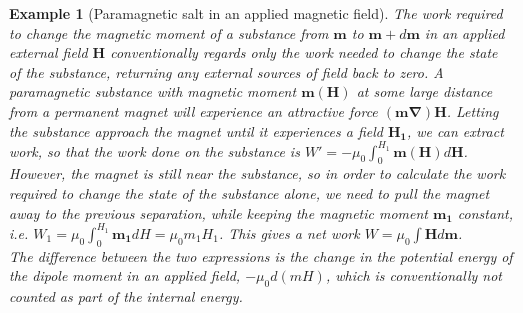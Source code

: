 \documentclass[a4paper]{article}
\newtheorem{eg}{Example}[section]
\theoremstyle{new}
\begin{document}
\begin{eg}[Paramagnetic salt in an applied magnetic field]
The work required to change the magnetic moment of a substance from $\mathbf{m}$ to $\mathbf{m}+d\mathbf{m}$ in an applied external field $\mathbf{H}$ conventionally regards only the work needed to change the state of the substance, returning any external sources of field back to zero. A paramagnetic substance with magnetic moment $\mathbf{m}(\mathbf{H})$ at some large distance from a permanent magnet will experience an attractive force $(\mathbf{m}\boldsymbol{\nabla})\mathbf{H}$. Letting the substance approach the magnet until it experiences a field $\mathbf{H_1}$, we can extract work, so that the work done on the substance is $W'=-\mu_0\int_0^{H_1}\mathbf{m}(\mathbf{H})d\mathbf{H}$. However, the magnet is still near the substance, so in order to calculate the work required to change the state of the substance alone, we need to pull the magnet away to the previous separation, while keeping the magnetic moment $\mathbf{m_1}$ constant, i.e. $W_1=\mu_0\int_0^{H_1}\mathbf{m_1}dH=\mu_0m_1H_1$. This gives a net work $W=\mu_0\int\mathbf{H} d\mathbf{m}$.\\[5pt]
The difference between the two expressions is the change in the potential energy of the dipole moment in an applied field, $-\mu_0d(mH)$, which is conventionally not counted as part of the internal energy. 
\end{eg}
\newpage
\end{document}
